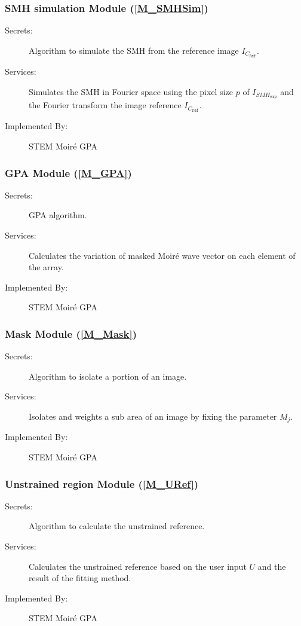 \documentclass[12pt, titlepage]{article}
\newcommand{\progname}{STEM Moir{\'e} GPA}
\begin{document}
\subsubsection{SMH simulation Module (\texorpdfstring{\cref{M_SMHSim}}))}

\begin{description}
\item[Secrets:] Algorithm to simulate the SMH from the reference image 
$I_{C_{\texttt{Ref}}}$.
\item[Services:] Simulates the SMH in Fourier space using the pixel size $p$ of 
$I_{\mathit{SMH}_{\texttt{exp}}}$ and the Fourier transform the image reference 
$I_{C_{\texttt{ref}}}$.
\item[Implemented By:] \progname{}
\end{description}

\subsubsection{GPA Module (\texorpdfstring{\cref{M_GPA}}))}

\begin{description}
\item[Secrets:] GPA algorithm.
\item[Services:] Calculates the variation of masked Moir{\'e} wave vector on 
each element of the array.
\item[Implemented By:] \progname{}
\end{description}

\subsubsection{Mask Module (\texorpdfstring{\cref{M_Mask}}))}

\begin{description}
\item[Secrets:] Algorithm to isolate a portion of an image.
\item[Services:] Isolates and weights a sub area of an image by fixing the 
parameter $M_j$.
\item[Implemented By:] \progname{}
\end{description}

\subsubsection{Unstrained region Module (\texorpdfstring{\cref{M_URef}}))}

\begin{description}
\item[Secrets:] Algorithm to calculate the unstrained reference.
\item[Services:] Calculates the unstrained reference based on the user input $U$ 
and the result of the fitting method.
\item[Implemented By:] \progname{}
\end{description}
\end{document}
